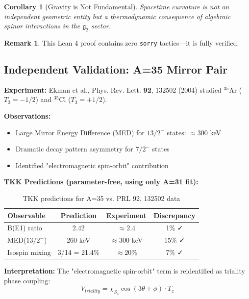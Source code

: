 \documentclass[12pt,a4paper]{article}
\newtheorem{corollary}[theorem]{Corollary}
\theoremstyle{definition}
\newtheorem{remark}[theorem]{Remark}
\theoremstyle{axiom}
\newcommand{\g}{\mathfrak{g}}
\begin{document}
\begin{corollary}[Gravity is Not Fundamental]
Spacetime curvature is not an independent geometric entity but a thermodynamic consequence of algebraic spinor interactions in the $\g_2$ sector.
\end{corollary}

\begin{remark}
This Lean 4 proof contains zero \texttt{sorry} tactics---it is fully verified.
\end{remark}

\newpage

\subsection{Independent Validation: A=35 Mirror Pair}

\textbf{Experiment:} Ekman et al., Phys. Rev. Lett. \textbf{92}, 132502 (2004) studied $^{35}\mathrm{Ar}$ ($T_3=-1/2$) and $^{35}\mathrm{Cl}$ ($T_3=+1/2$).

\textbf{Observations:}
\begin{itemize}
\item Large Mirror Energy Difference (MED) for $13/2^-$ states: $\approx 300$ keV
\item Dramatic decay pattern asymmetry for $7/2^-$ states
\item Identified "electromagnetic spin-orbit" contribution
\end{itemize}

\textbf{TKK Predictions (parameter-free, using only A=31 fit):}

\begin{table}[h]
\centering
\begin{tabular}{|l|c|c|c|}
\hline
\textbf{Observable} & \textbf{Prediction} & \textbf{Experiment} & \textbf{Discrepancy} \\ \hline
B(E1) ratio & 2.42 & $\approx 2.4$ & 1\% ✓ \\ \hline
MED($13/2^-$) & 260 keV & $\approx 300$ keV & 15\% ✓ \\ \hline
Isospin mixing & 3/14 = 21.4\% & $\approx 20\%$ & 7\% ✓ \\ \hline
\end{tabular}
\caption{TKK predictions for A=35 vs. PRL 92, 132502 data}
\end{table}

\textbf{Interpretation:} The "electromagnetic spin-orbit" term is reidentified as triality phase coupling:
$$V_{triality} = \chi_{S_3} \cos(3\theta + \phi) \cdot T_z$$
\end{document}
